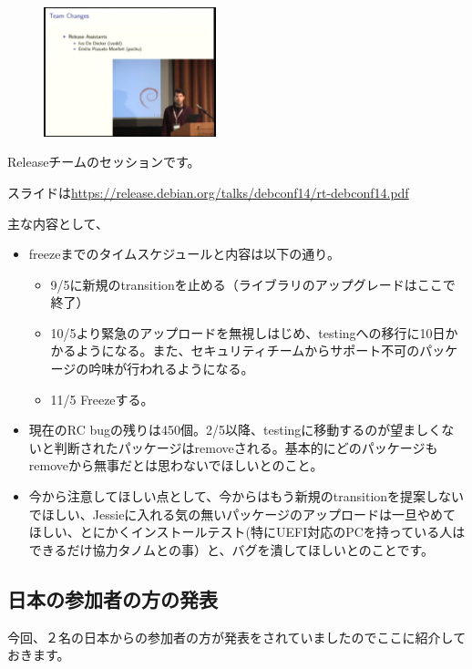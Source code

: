 \documentclass[mingoth,a4paper]{jsarticle}
\begin{document}
\begin{figure}
  \includegraphics[width=5cm]{image201409/jessie_release.png}
\end{figure}

 Releaseチームのセッションです。

 スライドは\url{https://release.debian.org/talks/debconf14/rt-debconf14.pdf}

 主な内容として、

\begin{itemize}
  \item freezeまでのタイムスケジュールと内容は以下の通り。
    \begin{itemize}
    \item 9/5に新規のtransitionを止める（ライブラリのアップグレードはここで終了）
    \item 10/5より緊急のアップロードを無視しはじめ、testingへの移行に10日かかるようになる。また、セキュリティチームからサポート不可のパッケージの吟味が行われるようになる。
    \item 11/5 Freezeする。
    \end{itemize}
\end{itemize}

\begin{itemize}
  \item 現在のRC bugの残りは450個。2/5以降、testingに移動するのが望ましくないと判断されたパッケージはremoveされる。基本的にどのパッケージもremoveから無事だとは思わないでほしいとのこと。
  \item 今から注意してほしい点として、今からはもう新規のtransitionを提案しないでほしい、Jessieに入れる気の無いパッケージのアップロードは一旦やめてほしい、とにかくインストールテスト(特にUEFI対応のPCを持っている人はできるだけ協力タノムとの事）と、バグを潰してほしいとのことです。
\end{itemize}

\subsection{日本の参加者の方の発表}

 今回、２名の日本からの参加者の方が発表をされていましたのでここに紹介しておきます。
\end{document}
